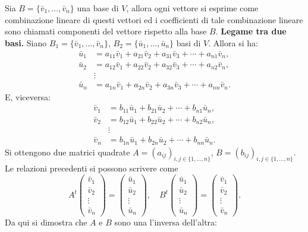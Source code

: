 \documentclass[11pt,a4paper]{article}
\newcommand{\pagina}[1]{\clearpage}
\begin{document}
Sia $B=\{\bar v_1,\ldots,\bar v_n\}$ una base di $V$, allora ogni vettore si esprime come combinazione lineare di questi vettori ed i coefficienti di tale combinazione lineare sono chiamati componenti del vettore rispetto alla base $B$.
\pagina{32}
\textbf{Legame tra due basi.} Siano $B_1=\{\bar v_1,\ldots,\bar v_n\}$, $B_2=\{\bar u_1,\ldots,\bar u_n\}$ basi di $V$. Allora si ha:
\[\begin{aligned}\bar u_1&=a_{11}\bar v_1+a_{21}\bar v_2+a_{31}\bar v_3+\cdots+a_{n1}\bar v_n,\\\bar u_2&=a_{12}\bar v_1+a_{22}\bar v_2+a_{32}\bar v_3+\cdots+a_{n2}\bar v_n,\\&\vdots\\\bar u_n&=a_{1n}\bar v_1+a_{2n}\bar v_2+a_{3n}\bar v_3+\cdots+a_{nn}\bar v_n.\end{aligned}\]
E, viceversa:
\[\begin{aligned}\bar v_1&=b_{11}\bar u_1+b_{21}\bar u_2+\cdots+b_{n1}\bar u_n,\\\bar v_2&=b_{12}\bar u_1+b_{22}\bar u_2+\cdots+b_{n2}\bar u_n,\\&\vdots\\\bar v_n&=b_{1n}\bar u_1+b_{2n}\bar u_2+\cdots+b_{nn}\bar u_n.\end{aligned}\]
Si ottengono due matrici quadrate $A=(a_{ij})_{i,j\in\{1,\ldots,n\}}$, $B=(b_{ij})_{i,j\in\{1,\ldots,n\}}$. Le relazioni precedenti si possono scrivere come
\[A^t\begin{pmatrix}\bar v_1\\\bar v_2\\\vdots\\\bar v_n\end{pmatrix}=\begin{pmatrix}\bar u_1\\\bar u_2\\\vdots\\\bar u_n\end{pmatrix},\quad B^t\begin{pmatrix}\bar u_1\\\bar u_2\\\vdots\\\bar u_n\end{pmatrix}=\begin{pmatrix}\bar v_1\\\bar v_2\\\vdots\\\bar v_n\end{pmatrix}.\]
Da qui si dimostra che $A$ e $B$ sono una l'inversa dell'altra:
\end{document}
